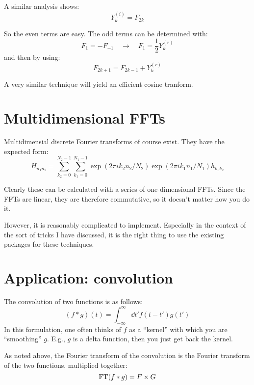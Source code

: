 A similar analysis shows:
\begin{equation}
Y^{(i)}_k = F_{2k}
\end{equation}

So the even terms are easy. The odd terms can be determined with:
\begin{equation}
F_1 = - F_{-1} \quad\rightarrow\quad F_1 = \frac{1}{2} Y_k^{(r)}
\end{equation}
and then by using:
\begin{equation}
F_{2k+1} = F_{2k-1} + Y_k^{(r)}
\end{equation}

A very similar technique will yield an efficient cosine tranform.

\section{Multidimensional FFTs}

Multidimensial discrete Fourier transforms of course exist. They have
the expected form:
\begin{equation}
H_{n_1n_2} =
\sum_{k_2=0}^{N_2-1}
\sum_{k_1=0}^{N_1-1}
\exp\left(2\pi i k_2 n_2 / N_2\right)
\exp\left(2\pi i k_1 n_1 / N_1\right)
h_{k_1k_2}
\end{equation}

Clearly these can be calculated with a series of one-dimensional
FFTs. Since the FFTs are linear, they are therefore commutative, so it
doesn't matter how you do it. 

However, it is reasonably complicated to implement. Especially in the
context of the sort of tricks I have discussed, it is the right thing
to use the existing packages for these techniques. 

\section{Application: convolution}

The convolution of two functions is as follows:
\begin{equation}
(f \ast g) (t) = \int_{-\infty}^{\infty} \dd{t'} f(t - t') g(t')
\end{equation}
In this formulation, one often thinks of $f$ as a ``kernel'' with
which you are ``smoothing'' $g$. E.g., $g$ is a delta function, then
you just get back the kernel.

As noted above, the Fourier transform of the convolution is the
Fourier transform of the two functions, multiplied together:
\begin{equation}
{\rm FT}(f \ast g) = F \times G
\end{equation}

